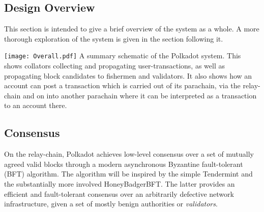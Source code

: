 \documentclass[usepdftitle=false]{beamer}
\begin{document}
\begin{frame}

\section{Design Overview}\label{design-overview}

 This section is intended to give a brief overview of the system as a whole. A more thorough exploration of the system is given in the section following it.

\texttt{[image: Overall.pdf]}
A summary schematic of the Polkadot system. This shows collators collecting and propagating user-transactions, as well as propagating block candidates to fishermen and validators. It also shows how an account can post a transaction which is carried out of its parachain, via the relay-chain and on into another parachain where it can be interpreted as a transaction to an account there.

\subsection{Consensus}\label{consensus}

 On the relay-chain, Polkadot achieves low-level consensus over a set of mutually agreed valid blocks through a modern asynchronous Byzantine fault-tolerant (BFT) algorithm. The algorithm will be inspired by the simple Tendermint\cite{kwon2014tendermint} and the substantially more involved HoneyBadgerBFT\cite{miller2016honey}. The latter provides an efficient and fault-tolerant consensus over an arbitrarily defective network infrastructure, given a set of mostly benign authorities or \emph{validators}.


\end{frame}
\end{document}
